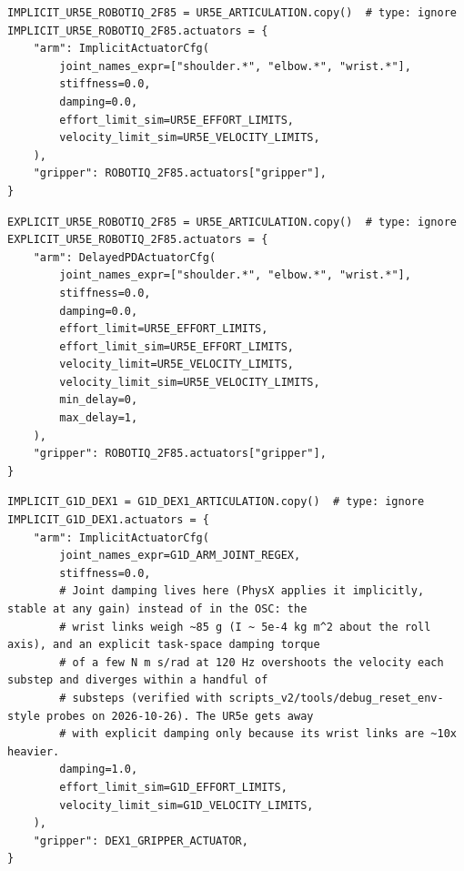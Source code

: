 \begin{snippetbox}[11]
\begin{lstlisting}[firstnumber=165]
IMPLICIT_UR5E_ROBOTIQ_2F85 = UR5E_ARTICULATION.copy()  # type: ignore
IMPLICIT_UR5E_ROBOTIQ_2F85.actuators = {
    "arm": ImplicitActuatorCfg(
        joint_names_expr=["shoulder.*", "elbow.*", "wrist.*"],
        stiffness=0.0,
        damping=0.0,
        effort_limit_sim=UR5E_EFFORT_LIMITS,
        velocity_limit_sim=UR5E_VELOCITY_LIMITS,
    ),
    "gripper": ROBOTIQ_2F85.actuators["gripper"],
}
\end{lstlisting}
\end{snippetbox}
\begin{snippetbox}[11]
\begin{lstlisting}[firstnumber=149]
EXPLICIT_UR5E_ROBOTIQ_2F85 = UR5E_ARTICULATION.copy()  # type: ignore
EXPLICIT_UR5E_ROBOTIQ_2F85.actuators = {
    "arm": DelayedPDActuatorCfg(
        joint_names_expr=["shoulder.*", "elbow.*", "wrist.*"],
        stiffness=0.0,
        damping=0.0,
        effort_limit=UR5E_EFFORT_LIMITS,
        effort_limit_sim=UR5E_EFFORT_LIMITS,
        velocity_limit=UR5E_VELOCITY_LIMITS,
        velocity_limit_sim=UR5E_VELOCITY_LIMITS,
        min_delay=0,
        max_delay=1,
    ),
    "gripper": ROBOTIQ_2F85.actuators["gripper"],
}
\end{lstlisting}
\end{snippetbox}
\begin{snippetbox}[11]
\begin{lstlisting}[firstnumber=137]
IMPLICIT_G1D_DEX1 = G1D_DEX1_ARTICULATION.copy()  # type: ignore
IMPLICIT_G1D_DEX1.actuators = {
    "arm": ImplicitActuatorCfg(
        joint_names_expr=G1D_ARM_JOINT_REGEX,
        stiffness=0.0,
        # Joint damping lives here (PhysX applies it implicitly, stable at any gain) instead of in the OSC: the
        # wrist links weigh ~85 g (I ~ 5e-4 kg m^2 about the roll axis), and an explicit task-space damping torque
        # of a few N m s/rad at 120 Hz overshoots the velocity each substep and diverges within a handful of
        # substeps (verified with scripts_v2/tools/debug_reset_env-style probes on 2026-10-26). The UR5e gets away
        # with explicit damping only because its wrist links are ~10x heavier.
        damping=1.0,
        effort_limit_sim=G1D_EFFORT_LIMITS,
        velocity_limit_sim=G1D_VELOCITY_LIMITS,
    ),
    "gripper": DEX1_GRIPPER_ACTUATOR,
}
\end{lstlisting}
\end{snippetbox}
